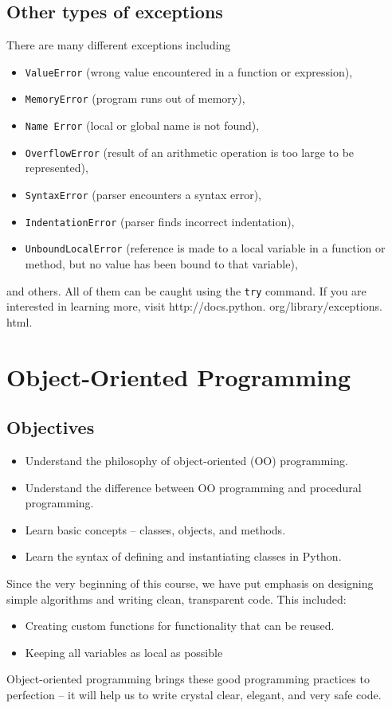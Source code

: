 \subsection{Other types of exceptions}

There are many different exceptions including 
\begin{itemize}
\item {\tt ValueError} (wrong value encountered in a function or expression), 
\item {\tt MemoryError} (program runs out of memory),
\item {\tt Name Error} (local or global name is not found), 
\item {\tt OverflowError} (result of an arithmetic operation is too large to be represented), 
\item {\tt SyntaxError} (parser encounters a syntax error),
\item {\tt IndentationError} (parser finds incorrect indentation), 
\item {\tt UnboundLocalError} (reference is made to a local variable in a function or method, 
      but no value has been bound to that variable),
\end{itemize}
and others. All of them can be caught using the {\tt try} command. If you are interested in 
learning more, visit http://docs.python. org/library/exceptions. html.


\section{Object-Oriented Programming}

\subsection{Objectives}

\begin{itemize}
\item Understand the philosophy of object-oriented (OO) programming.
\item Understand the difference between OO programming and procedural programming.
\item Learn basic concepts -- classes, objects, and methods.
\item Learn the syntax of defining and instantiating classes in Python.
\end{itemize}
Since the very beginning of this course, 
we have put emphasis on designing simple algorithms
and writing clean, transparent code. This included:
\begin{itemize}
\item Creating custom functions for functionality that can be reused.
\item Keeping all variables as local as possible
\end{itemize}
Object-oriented programming brings these good programming practices to
perfection -- it will help us to write crystal clear, elegant, and very safe code.


